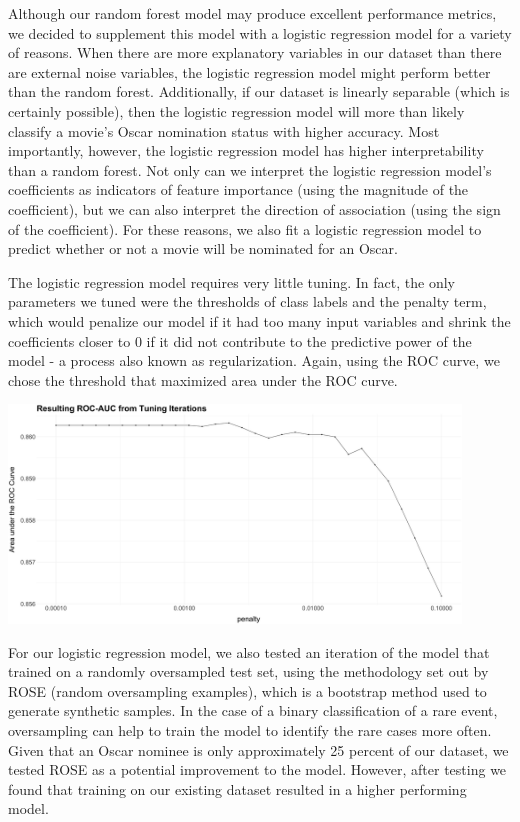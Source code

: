 \documentclass[10pt]{article}
\begin{document}
Although our random forest model may produce excellent performance metrics, we decided to supplement this model with a logistic regression model for a variety of reasons. When there are more explanatory variables in our dataset than there are external noise variables, the logistic regression model might perform better than the random forest. Additionally, if our dataset is linearly separable (which is certainly possible), then the logistic regression model will more than likely classify a movie’s Oscar nomination status with higher accuracy. Most importantly, however, the logistic regression model has higher interpretability than a random forest. Not only can we interpret the logistic regression model’s coefficients as indicators of feature importance (using the magnitude of the coefficient), but we can also interpret the direction of association (using the sign of the coefficient). For these reasons, we also fit a logistic regression model to predict whether or not a movie will be nominated for an Oscar.

The logistic regression model requires very little tuning. In fact, the only parameters we tuned were the thresholds of class labels and the penalty term, which would penalize our model if it had too many input variables and shrink the coefficients closer to 0 if it did not contribute to the predictive power of the model - a process also known as regularization. Again, using the ROC curve, we chose the threshold that maximized area under the ROC curve.

\begin{center}
\includegraphics[width=12cm]{_assets/log-reg-plots/log_reg__tuning-plot-roc-curve-1.png}
\end{center}

For our logistic regression model, we also tested an iteration of the model that trained on a randomly oversampled test set, using the methodology set out by ROSE (random oversampling examples), which is a bootstrap method used to generate synthetic samples. In the case of a binary classification of a rare event, oversampling can help to train the model to identify the rare cases more often. Given that an Oscar nominee is only approximately 25 percent of our dataset, we tested ROSE as a potential improvement to the model. However, after testing we found that training on our existing dataset resulted in a higher performing model.
\end{document}
